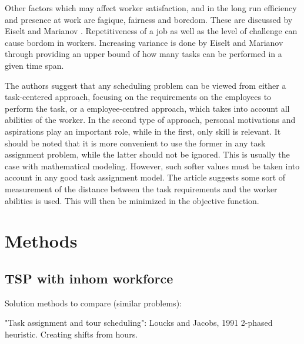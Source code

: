 Other factors which may affect worker satisfaction, and in the long run efficiency and presence at work are fagique, fairness and boredom. These are discussed by Eiselt and Marianov \cite{eiselt_2006}. Repetitiveness of a job as well as the level of challenge can cause bordom in workers. Increasing variance is done by Eiselt and Marianov through providing an upper bound of how many tasks can be performed in a given time span. 

The authors suggest that any scheduling problem can be viewed from either a task-centered approach, focusing on the requirements on the employees to perform the task, or a employee-centred approach, which takes into account all abilities of the worker. In the second type of approach, personal motivations and aspirations play an important role, while in the first, only skill is relevant. It should be noted that it is more convenient to use the former in any task assignment problem, while the latter should not be ignored. This is usually the case with mathematical modeling. However, such softer values must be taken into account in any good task assignment model. The article suggests some sort of measurement of the distance between the task requirements and the worker abilities is used. This will then be minimized in the objective function.

%
%
%


\section{Methods}
\subsection{TSP with inhom workforce}

Solution methods to compare (similar problems):

"Task assignment and tour scheduling": Loucks and Jacobs, 1991
2-phased heuristic. Creating shifts from hours.




